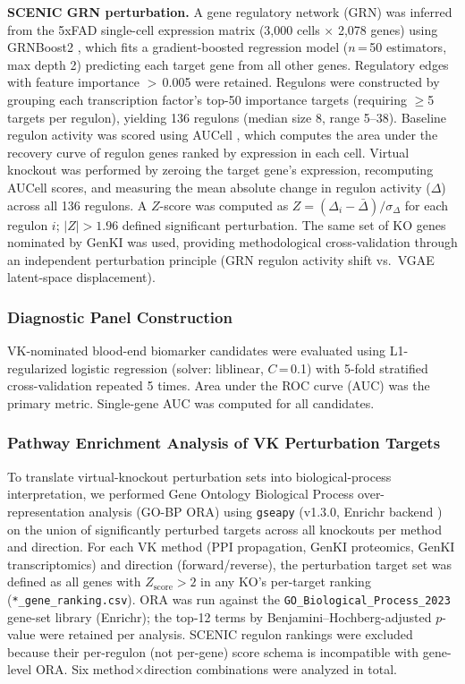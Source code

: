 \documentclass[12pt,a4paper]{article}
\begin{document}
\textbf{SCENIC GRN perturbation.} A gene regulatory network (GRN) was inferred from the 5xFAD single-cell expression matrix (3{,}000 cells $\times$ 2{,}078 genes) using GRNBoost2 \citep{moerman2019}, which fits a gradient-boosted regression model ($n$\,=\,50 estimators, max depth 2) predicting each target gene from all other genes. Regulatory edges with feature importance $>$\,0.005 were retained. Regulons were constructed by grouping each transcription factor's top-50 importance targets (requiring $\geq$5 targets per regulon), yielding 136 regulons (median size 8, range 5--38). Baseline regulon activity was scored using AUCell \citep{aibar2017}, which computes the area under the recovery curve of regulon genes ranked by expression in each cell. Virtual knockout was performed by zeroing the target gene's expression, recomputing AUCell scores, and measuring the mean absolute change in regulon activity ($\Delta$) across all 136 regulons. A $Z$-score was computed as $Z = (\Delta_i - \bar{\Delta}) / \sigma_\Delta$ for each regulon $i$; $|Z| > 1.96$ defined significant perturbation. The same set of KO genes nominated by GenKI was used, providing methodological cross-validation through an independent perturbation principle (GRN regulon activity shift vs.\ VGAE latent-space displacement).

\subsubsection{Diagnostic Panel Construction}

VK-nominated blood-end biomarker candidates were evaluated using L1-regularized logistic regression (solver: liblinear, $C$\,=\,0.1) with 5-fold stratified cross-validation repeated 5 times. Area under the ROC curve (AUC) was the primary metric. Single-gene AUC was computed for all candidates.

\subsubsection{Pathway Enrichment Analysis of VK Perturbation Targets}

To translate virtual-knockout perturbation sets into biological-process interpretation, we performed Gene Ontology Biological Process over-representation analysis (GO-BP ORA) using \texttt{gseapy} (v1.3.0, Enrichr backend \citep{kuleshov2016}) on the union of significantly perturbed targets across all knockouts per method and direction. For each VK method (PPI propagation, GenKI proteomics, GenKI transcriptomics) and direction (forward/reverse), the perturbation target set was defined as all genes with $Z_\text{score} > 2$ in any KO's per-target ranking (\texttt{*\_gene\_ranking.csv}). ORA was run against the \texttt{GO\_Biological\_Process\_2023} gene-set library (Enrichr); the top-12 terms by Benjamini--Hochberg-adjusted $p$-value were retained per analysis. SCENIC regulon rankings were excluded because their per-regulon (not per-gene) score schema is incompatible with gene-level ORA. Six method$\times$direction combinations were analyzed in total.
\end{document}
